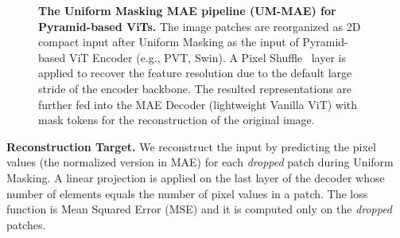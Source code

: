 \documentclass{article}
\begin{document}
\begin{figure}[t]
	\vspace{0pt}
	\begin{center}
		\setlength{\fboxrule}{0pt}
	\end{center}	
	\vspace{-7pt}
	\caption{\textbf{The Uniform Masking MAE pipeline (UM-MAE) for Pyramid-based ViTs.} The image patches are reorganized as 2D compact input after Uniform Masking as the input of Pyramid-based ViT Encoder (e.g., PVT, Swin). A Pixel Shuffle~\cite{shi2016real,paszke2019pytorch} layer is applied to recover the feature resolution due to the default large stride of the encoder backbone. The resulted representations are further fed into the MAE Decoder (lightweight Vanilla ViT) with mask tokens for the reconstruction of the original image.
	}
	\label{fig_detail_pipeline_cropped}
	\vspace{-4pt}
\end{figure}

\textbf{Reconstruction Target.} We reconstruct the input by predicting the pixel values (the normalized version in MAE) for each \emph{dropped} patch during Uniform Masking. A linear projection is applied on the last layer of the decoder whose number of elements equals the number of pixel values in a patch. The loss function is Mean Squared Error (MSE) and it is computed only on the \emph{dropped} patches. 
\end{document}
